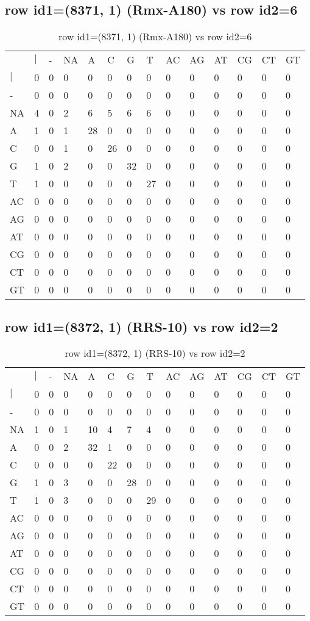 \subsection{row id1=(8371, 1) (Rmx-A180) vs row id2=6}
\begin{center}
\begin{longtable}{|l|l|l|l|l|l|l|l|l|l|l|l|l|l|}
\caption{row id1=(8371, 1) (Rmx-A180) vs row id2=6} \label{table_dm606}\\
\hline
\\
\hline
&$|$&-&NA&A&C&G&T&AC&AG&AT&CG&CT&GT\\
$|$&0&0&0&0&0&0&0&0&0&0&0&0&0\\
-&0&0&0&0&0&0&0&0&0&0&0&0&0\\
NA&4&0&2&6&5&6&6&0&0&0&0&0&0\\
A&1&0&1&28&0&0&0&0&0&0&0&0&0\\
C&0&0&1&0&26&0&0&0&0&0&0&0&0\\
G&1&0&2&0&0&32&0&0&0&0&0&0&0\\
T&1&0&0&0&0&0&27&0&0&0&0&0&0\\
AC&0&0&0&0&0&0&0&0&0&0&0&0&0\\
AG&0&0&0&0&0&0&0&0&0&0&0&0&0\\
AT&0&0&0&0&0&0&0&0&0&0&0&0&0\\
CG&0&0&0&0&0&0&0&0&0&0&0&0&0\\
CT&0&0&0&0&0&0&0&0&0&0&0&0&0\\
GT&0&0&0&0&0&0&0&0&0&0&0&0&0\\
\hline
\end{longtable}
\end{center}

\subsection{row id1=(8372, 1) (RRS-10) vs row id2=2}
\begin{center}
\begin{longtable}{|l|l|l|l|l|l|l|l|l|l|l|l|l|l|}
\caption{row id1=(8372, 1) (RRS-10) vs row id2=2} \label{table_dm608}\\
\hline
\\
\hline
&$|$&-&NA&A&C&G&T&AC&AG&AT&CG&CT&GT\\
$|$&0&0&0&0&0&0&0&0&0&0&0&0&0\\
-&0&0&0&0&0&0&0&0&0&0&0&0&0\\
NA&1&0&1&10&4&7&4&0&0&0&0&0&0\\
A&0&0&2&32&1&0&0&0&0&0&0&0&0\\
C&0&0&0&0&22&0&0&0&0&0&0&0&0\\
G&1&0&3&0&0&28&0&0&0&0&0&0&0\\
T&1&0&3&0&0&0&29&0&0&0&0&0&0\\
AC&0&0&0&0&0&0&0&0&0&0&0&0&0\\
AG&0&0&0&0&0&0&0&0&0&0&0&0&0\\
AT&0&0&0&0&0&0&0&0&0&0&0&0&0\\
CG&0&0&0&0&0&0&0&0&0&0&0&0&0\\
CT&0&0&0&0&0&0&0&0&0&0&0&0&0\\
GT&0&0&0&0&0&0&0&0&0&0&0&0&0\\
\hline
\end{longtable}
\end{center}

